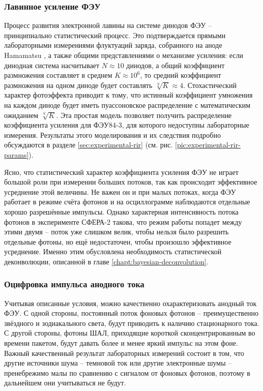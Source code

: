 \subsubsection{Лавинное усиление ФЭУ}
\label{sec:pmt-amplification-description}

Процесс развития электронной лавины на системе динодов ФЭУ -- принципиально статистический процесс. Это подтверждается прямыми лабораторными измерениями флуктуаций заряда, собранного на аноде Hamamatsu \cite[рис. 9]{SphereCalibration2016}, а также общими представлениями о механизме усиления: если динодная система насчитывает $N \approx 10$ динодов, а общий коэффициент размножения составляет в среднем $K \approx 10^6$, то средний коэффициент размножения на одном диноде будет составлять $\sqrt[N]{K} \approx 4$. Стохастический характер фотоэффекта приводит к тому, что истинный коэффициент умножения на каждом диноде будет иметь пуассоновское распределение с математическим ожиданием $\sqrt[N]{K}$. Эта простая модель позволяет получить распределение коэффициента усиления для ФЭУ84-3, для которого недоступны лабораторные измерения. Результаты этого моделирования и их следствия подробно обсуждаются в разделе \ref{sec:experimental-rir} (см. рис. \ref{pic:experimental-rir-params}).

Ясно, что статистический характер коэффициента усиления ФЭУ не играет большой роли при измерении больших потоков, так как происходит эффективное усреднение этой величины. Не важен он и при малых потоках, когда ФЭУ работает в режиме счёта фотонов и на осциллограмме наблюдаются отдельные хорошо разрешённые импульсы. Однако характерная интенсивность потока фотонов в эксперименте СФЕРА-2 такова, что режим работы попадет между этими двумя -- поток уже слишком велик, чтобы нельзя было разрешить отдельные фотоны, но ещё недостаточен, чтобы произошло эффективное усреднение. Именно этим обусловлена необходимость статистической деконволюции, описанной в главе \ref{chapt:bayesian-deconvolution}.

\subsubsection{Оцифровка импульса анодного тока}

Учитывая описанные условия, можно качественно охарактеризовать анодный ток ФЭУ. С одной стороны, постоянный поток фоновых фотонов -- преимущественно звёздного и зодиакального света, будут приводить к наличию стационарного тока. С другой стороны, фотоны ШАЛ, приходящие короткой сконцентрированным во времени пакетом, будут давать более и менее яркий импульс на этом фоне. Важный качественный результат лабораторных измерений состоит в том, что другие источники шума -- темновой ток или другие электронные шумы -- пренебрежимо малы по сравнению с сигналом от фоновых фотонов, поэтому в дальнейшем они учитываться не будут.

